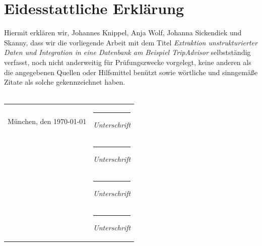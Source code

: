 \documentclass[a4paper,oneside,12pt]{report}
\begin{document}
	
	
	\newpage
	\chapter*{Eidesstattliche Erklärung}
		Hiermit erklären wir, Johannes Knippel, Anja Wolf, Johanna Sickendiek und Skanny, dass wir die vorliegende Arbeit mit dem Titel \textit{Extraktion unstrukturierter Daten und Integration in eine Datenbank am Beispiel TripAdvisor} selbstständig verfasst, noch nicht anderweitig für Prüfungszwecke vorgelegt, keine anderen als die angegebenen Quellen oder Hilfsmittel benützt sowie wörtliche und sinngemäße Zitate als solche gekennzeichnet haben.
		\vspace{15mm}
		\\
		\\
		\begin{flushleft}
			\begin{tabular}[H]{ll}
				
				München, den \parbox{5,5cm}{\today}  	& 	\parbox{6cm}{\hrule\medskip \textit{Unterschrift}}\\[2cm]
													  	& 	\parbox{6cm}{\hrule\medskip \textit{Unterschrift}}\\[2cm]
													  	& 	\parbox{6cm}{\hrule\medskip \textit{Unterschrift}}\\[2cm]
													  	& 	\parbox{6cm}{\hrule\medskip \textit{Unterschrift}}\\[2cm]
			\end{tabular}
		\end{flushleft}
\end{document}
